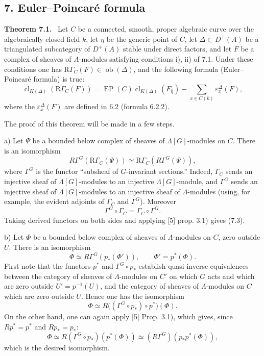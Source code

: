\documentclass[11pt]{article}
\newenvironment{statement}[1]{\par\medskip\noindent\textbf{#1.}\ }{\par\medskip}
\providecommand{\EP}{\operatorname{EP}}
\providecommand{\Ob}{\operatorname{ob}}
\providecommand{\Ob}{\operatorname{ob}}
\providecommand{\EP}{\operatorname{EP}}
\providecommand{\Ob}{\operatorname{Ob}}
\providecommand{\clK}[1]{\operatorname{cl}_{K(#1)}}
\providecommand{\RG}{\mathrm R\Gamma}
\providecommand{\Ob}{\operatorname{ob}}
\begin{document}
\subsection*{7. Euler--Poincaré formula}

\begin{statement}{Theorem 7.1}
Let $C$ be a connected, smooth, proper algebraic curve over the algebraically closed field $k$, let $\eta$ be the generic point of $C$, let $\Delta\subset D^+(A)$ be a triangulated subcategory of $D^+(A)$ stable under direct factors, and let $F$ be a complex of sheaves of $A$-modules satisfying conditions i), ii) of 7.1. Under these conditions one has $\RG_C(F)\in\Ob(\Delta)$, and the following formula (Euler--Poincaré formula) is true:
\[
\clK{\Delta}(\RG_C(F))
=
\EP(C)\clK{\Delta}(F_{\bar\eta})
-\sum_{x\in C(k)}\varepsilon_x^\Delta(F),
\tag{7.2}
\]
where the $\varepsilon_x^\Delta(F)$ are defined in 6.2 (formula 6.2.2).
\end{statement}

The proof of this theorem will be made in a few steps.

a) Let $\Psi$ be a bounded below complex of sheaves of $\Lambda[G]$-modules on $C$. There is an isomorphism
\[
R\Gamma^G(\RG_C(\Psi))\simeq\RG_C(R\Gamma^G(\Psi)),
\tag{7.3}
\]
where $\Gamma^G$ is the functor ``subsheaf of $G$-invariant sections.'' Indeed, $\Gamma_C$ sends an injective sheaf of $\Lambda[G]$-modules to an injective $\Lambda[G]$-module, and $\Gamma^G$ sends an injective sheaf of $\Lambda[G]$-modules to an injective sheaf of $\Lambda$-modules (using, for example, the evident adjoints of $\Gamma_C$ and $\Gamma^G$). Moreover
\[
\Gamma^G\circ\Gamma_C=\Gamma_C\circ\Gamma^G.
\]
Taking derived functors on both sides and applying [5] prop. 3.1) gives (7.3).

b) Let $\Phi$ be a bounded below complex of sheaves of $\Lambda$-modules on $C$, zero outside $U$. There is an isomorphism
\[
\Phi\simeq R\Gamma^G(p_*(\Phi')),
\qquad \Phi'=p^*(\Phi).
\tag{7.4}
\]
First note that the functors $p^*$ and $\Gamma^G\circ p_*$ establish quasi-inverse equivalences between the category of sheaves of $\Lambda$-modules on $C'$ on which $G$ acts and which are zero outside $U'=p^{-1}(U)$, and the category of sheaves of $\Lambda$-modules on $C$ which are zero outside $U$. Hence one has the isomorphism
\[
\Phi\simeq R\bigl((\Gamma^G\circ p_*)\circ p^*\bigr)(\Phi).
\]
On the other hand, one can again apply [5] Prop. 3.1), which gives, since $Rp^*=p^*$ and $Rp_*=p_*$:
\[
\Phi\simeq R(\Gamma^G\circ p_*)(p^*(\Phi))
\simeq (R\Gamma^G)(p_*p^*(\Phi)),
\]
which is the desired isomorphism.
\end{document}

